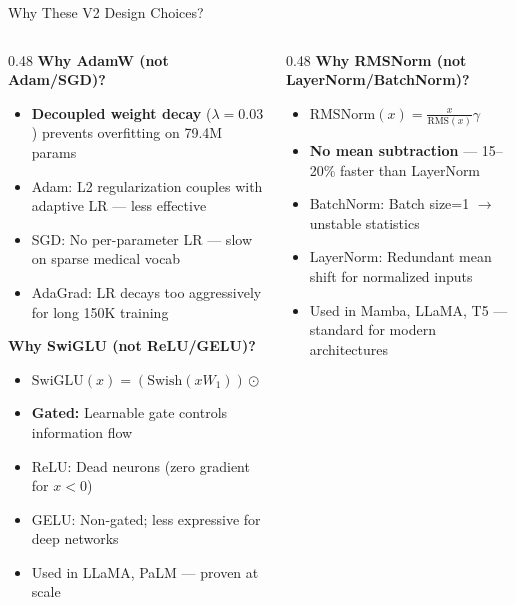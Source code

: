 \documentclass[10pt, aspectratio=169]{beamer}
\begin{document}
\begin{frame}{Why These V2 Design Choices?}
  \footnotesize
  \begin{columns}[T]
    \begin{column}{0.48\textwidth}
      \textbf{Why AdamW (not Adam/SGD)?}
      \begin{itemize}\setlength{\itemsep}{0pt}
        \item \textbf{Decoupled weight decay} ($\lambda{=}0.03$) prevents overfitting on 79.4M params
        \item Adam: L2 regularization couples with adaptive LR --- less effective
        \item SGD: No per-parameter LR --- slow on sparse medical vocab
        \item AdaGrad: LR decays too aggressively for long 150K training
      \end{itemize}

      \vspace{0.1cm}
      \textbf{Why SwiGLU (not ReLU/GELU)?}
      \begin{itemize}\setlength{\itemsep}{0pt}
        \item $\text{SwiGLU}(x) = (\text{Swish}(xW_1)) \odot (xW_2)$
        \item \textbf{Gated:} Learnable gate controls information flow
        \item ReLU: Dead neurons (zero gradient for $x<0$)
        \item GELU: Non-gated; less expressive for deep networks
        \item Used in LLaMA, PaLM --- proven at scale
      \end{itemize}
    \end{column}
    \begin{column}{0.48\textwidth}
      \textbf{Why RMSNorm (not LayerNorm/BatchNorm)?}
      \begin{itemize}\setlength{\itemsep}{0pt}
        \item $\text{RMSNorm}(x) = \frac{x}{\text{RMS}(x)} \gamma$
        \item \textbf{No mean subtraction} --- 15--20\% faster than LayerNorm
        \item BatchNorm: Batch size=1 $\rightarrow$ unstable statistics
        \item LayerNorm: Redundant mean shift for normalized inputs
        \item Used in Mamba, LLaMA, T5 --- standard for modern architectures
      \end{itemize}


\end{column}
\end{columns}
\end{frame}
\end{document}

